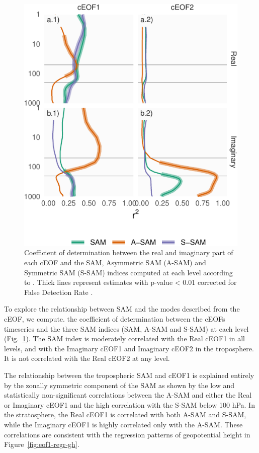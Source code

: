 \documentclass[smallextended]{svjour3}       %
\begin{document}
\begin{figure}
\centering
\includegraphics{../figures/sam-eof-vertical-1.pdf}
\caption{\label{fig:sam-eof-vertical}Coefficient of determination between the real and imaginary part of each cEOF and the SAM, Asymmetric SAM (A-SAM) and Symmetric SAM (S-SAM) indices computed at each level according to \citet{campitelli2021}. Thick lines represent estimates with p-value \textless{} 0.01 corrected for False Detection Rate \citep{benjamini1995}.}
\end{figure}

To explore the relationship between SAM and the modes described from the cEOF, we compute. the coefficient of determination between the cEOFs timeseries and the three SAM indices (SAM, A-SAM and S-SAM) at each level (Fig.~\ref{fig:sam-eof-vertical}). The SAM index is moderately correlated with the Real cEOF1 in all levels, and with the Imaginary cEOF1 and Imaginary cEOF2 in the troposphere. It is not correlated with the Real cEOF2 at any level.

The relationship between the tropospheric SAM and cEOF1 is explained entirely by the zonally symmetric component of the SAM as shown by the low and statistically non-significant correlations between the A-SAM and either the Real or Imaginary cEOF1 and the high correlation with the S-SAM below 100 hPa. In the stratosphere, the Real cEOF1 is correlated with both A-SAM and S-SAM, while the Imaginary cEOF1 is highly correlated only with the A-SAM. These correlations are consistent with the regression patterns of geopotential height in Figure~\ref{fig:eof1-regr-gh}.
\end{document}
